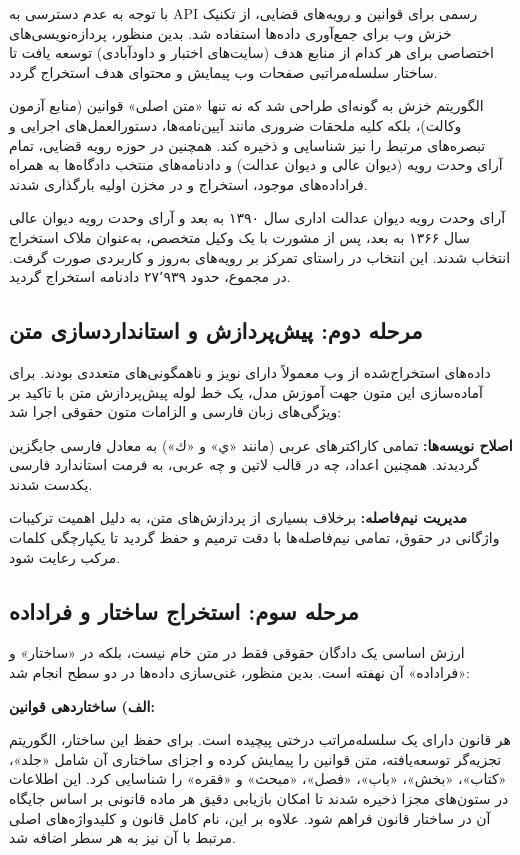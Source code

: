 \documentclass[12pt,a4paper]{report}
\begin{document}
	با توجه به عدم دسترسی به API رسمی برای قوانین و رویه‌های قضایی، از تکنیک خزش وب برای جمع‌آوری داده‌ها استفاده شد. بدین منظور، پردازه‌نویسی‌های اختصاصی برای هر کدام از منابع هدف (سایت‌های اختبار و داودآبادی) توسعه یافت تا ساختار سلسله‌مراتبی صفحات وب پیمایش و محتوای هدف استخراج گردد. 
	
	الگوریتم خزش به گونه‌ای طراحی شد که نه تنها «متن اصلی» قوانین (منابع آزمون وکالت)، بلکه کلیه ملحقات ضروری مانند آیین‌نامه‌ها، دستورالعمل‌های اجرایی و تبصره‌های مرتبط را نیز شناسایی و ذخیره کند. همچنین در حوزه رویه قضایی، تمام آرای وحدت رویه (دیوان عالی و دیوان عدالت) و دادنامه‌های منتخب دادگاه‌ها به همراه فراداده‌های موجود، استخراج و در مخزن اولیه بارگذاری شدند.
	
	آرای وحدت رویه دیوان عدالت اداری سال ۱۳۹۰ به بعد و آرای وحدت رویه دیوان عالی سال ۱۳۶۶ به بعد، پس از مشورت با یک وکیل متخصص، به‌عنوان ملاک استخراج انتخاب شدند. این انتخاب در راستای تمرکز بر رویه‌های به‌روز و کاربردی صورت گرفت. در مجموع، حدود ۲۷٬۹۳۹ دادنامه استخراج گردید.
	
	\subsection{مرحله دوم: پیش‌پردازش و استانداردسازی متن}
	
	داده‌های استخراج‌شده از وب معمولاً دارای نویز و ناهمگونی‌های متعددی بودند. برای آماده‌سازی این متون جهت آموزش مدل، یک خط لوله پیش‌پردازش متن با تاکید بر ویژگی‌های زبان فارسی و الزامات متون حقوقی اجرا شد:
	
	\textbf{اصلاح نویسه‌ها:} تمامی کاراکترهای عربی (مانند «ي» و «ك») به معادل فارسی جایگزین گردیدند. همچنین اعداد، چه در قالب لاتین و چه عربی، به فرمت استاندارد فارسی یکدست شدند.
	
	\textbf{مدیریت نیم‌فاصله:} برخلاف بسیاری از پردازش‌های متن، به دلیل اهمیت ترکیبات واژگانی در حقوق، تمامی نیم‌فاصله‌ها با دقت ترمیم و حفظ گردید تا یکپارچگی کلمات مرکب رعایت شود.
	
	\subsection{مرحله سوم: استخراج ساختار و فراداده}
	
	ارزش اساسی یک دادگان حقوقی فقط در متن خام نیست، بلکه در «ساختار» و «فراداده‌» آن نهفته است. بدین منظور، غنی‌سازی داده‌ها در دو سطح انجام شد:
	
	\textbf{الف) ساختاردهی قوانین:}
	
	هر قانون دارای یک سلسله‌مراتب درختی پیچیده است. برای حفظ این ساختار، الگوریتم تجزیه‌گر  توسعه‌یافته، متن قوانین را پیمایش کرده و اجزای ساختاری آن شامل «جلد»، «کتاب»، «بخش»، «باب»، «فصل»، «مبحث» و «فقره» را شناسایی کرد. این اطلاعات در ستون‌های مجزا ذخیره شدند تا امکان بازیابی دقیق هر ماده قانونی بر اساس جایگاه آن در ساختار قانون فراهم شود. علاوه بر این، نام کامل قانون و کلیدواژه‌های اصلی مرتبط با آن نیز به هر سطر  اضافه شد.
	
\end{document}

